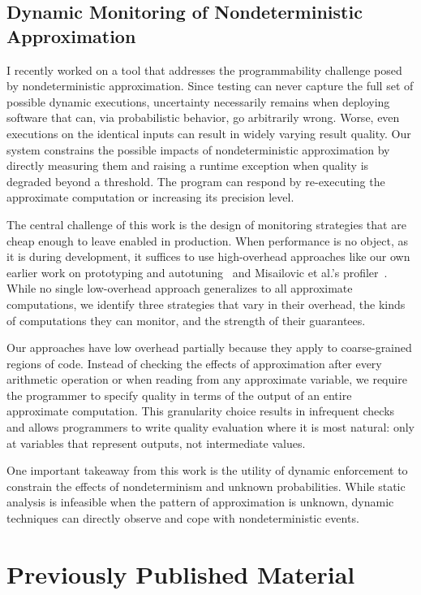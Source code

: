 \subsection{Dynamic Monitoring of Nondeterministic Approximation}
\label{sec:prelim:monitor}

I recently worked on a tool that addresses the programmability challenge posed
by nondeterministic approximation. Since testing can never capture
the full set of possible dynamic executions, uncertainty necessarily remains
when deploying software that can, via probabilistic behavior, go arbitrarily
wrong. Worse, even executions on the identical inputs can result in
widely varying result quality. Our system constrains the possible impacts of
nondeterministic approximation by directly measuring them and raising a
runtime exception when quality is degraded beyond a threshold. The program can
respond by re-executing the approximate computation or increasing its
precision level.

The central challenge of this work is the design of monitoring strategies that
are cheap enough to leave enabled in production. When performance is no object,
as it is during development, it suffices to use high-overhead approaches like our
own earlier work on prototyping and autotuning~\cite{enercaml} and Misailovic
et al.'s profiler~\cite{qosprof}.
While no single low-overhead approach
generalizes to all approximate computations, we identify three strategies that
vary in their overhead, the kinds of computations they can monitor, and the
strength of their guarantees.

Our approaches have low overhead partially because they apply to
coarse-grained regions of code. Instead of checking the effects of
approximation after every arithmetic operation or when reading from any
approximate variable, we require the programmer to specify quality in terms of
the output of an entire approximate computation. This granularity choice
results in infrequent checks and allows programmers to write quality
evaluation where it is most natural: only at variables that represent outputs, not intermediate
values.

One important takeaway from this work is the utility of dynamic enforcement
to constrain the effects of nondeterminism and unknown probabilities. While
static analysis is infeasible when the pattern of approximation is unknown,
dynamic techniques can directly observe and cope with nondeterministic events.


\section{Previously Published Material}

